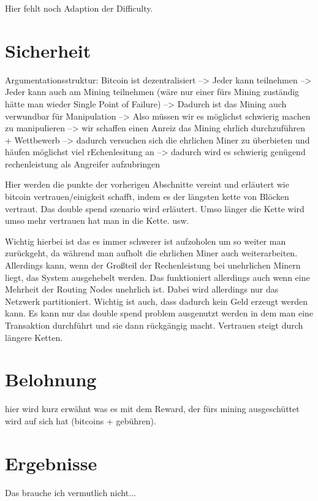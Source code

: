 \documentclass[ngerman,runningheads,a4paper]{llncs}[2018/03/10]
\begin{document}
Hier fehlt noch Adaption der Difficulty.

\section{Sicherheit}\label{sec:Sicherheit}


Argumentationsstruktur: Bitcoin ist dezentralisiert --> Jeder kann teilnehmen --> Jeder kann auch am Mining teilnehmen (wäre nur einer fürs Mining zuständig hätte man wieder Single Point of Failure) --> Dadurch ist das Mining auch verwundbar für Manipulation --> Also müssen wir es möglichst schwierig machen zu manipulieren --> wir schaffen einen Anreiz das Mining ehrlich durchzuführen + Wettbewerb --> dadurch versuchen sich die ehrlichen Miner zu überbieten und häufen möglichst viel rEchenlesitung an --> dadurch wird es schwierig genügend rechenleistung als Angreifer aufzubringen


Hier werden die punkte der vorherigen Abschnitte vereint und erläutert wie bitcoin vertrauen/einigkeit schafft, indem es der längsten kette von Blöcken vertraut. Das double spend szenario wird erläutert. Umso länger die Kette wird umso mehr vertrauen hat man in die Kette. usw.

Wichtig hierbei ist das es immer schwerer ist aufzoholen um so weiter man zurückgeht, da während man aufholt die ehrlichen Miner auch weiterarbeiten. Allerdings kann, wenn der Großteil der Rechenleistung bei unehrlichen Minern liegt, das System ausgehebelt werden. Das funktioniert allerdings auch wenn eine Mehrheit der Routing Nodes unehrlich ist. Dabei wird allerdings nur das Netzwerk partitioniert. Wichtig ist auch, dass dadurch kein Geld erzeugt werden kann. Es kann nur das double spend problem ausgenutzt werden in dem man eine Transaktion durchführt und sie dann rückgängig macht. Vertrauen steigt durch längere Ketten.

\section{Belohnung}\label{sec:belohnung}

hier wird kurz erwähnt was es mit dem Reward, der fürs mining ausgeschüttet wird auf sich hat (bitcoins + gebühren).

\section{Ergebnisse}\label{sec:ergebnisse}

Das brauche ich vermutlich nicht...
\end{document}
